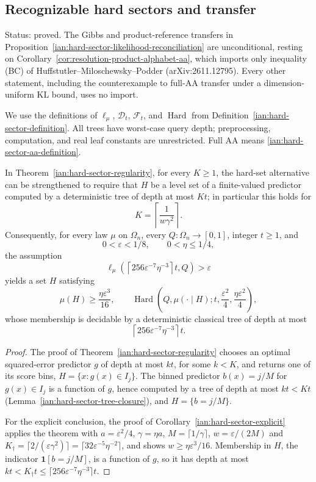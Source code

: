 \subsection{Recognizable hard sectors and transfer}
\label{ian:hard-sector-transfer}

Status: proved. The Gibbs and product-reference transfers in Proposition~\ref{ian:hard-sector-likelihood-reconciliation} are unconditional, resting on Corollary~\ref{cor:resolution-product-alphabet-aa}, which imports only inequality (BC) of Huffstutler--Miloschewsky--Podder (arXiv:2611.12795). Every other statement, including the counterexample to full-AA transfer under a dimension-uniform KL bound, uses no import.

We use the definitions of \(\ell_\mu\), \(\mathcal D_t\),
\(\mathcal F_t\), and \(\operatorname{Hard}\) from
Definition~\ref{ian:hard-sector-definition}. All trees have worst-case
query depth; preprocessing, computation, and real leaf constants are
unrestricted. Full AA means \eqref{ian:hard-sector-aa-definition}.

\begin{corollary}
\label{ian:recognizable-hard-sectors}
In Theorem~\ref{ian:hard-sector-regularity}, for every \(K\ge1\), the
hard-set alternative can be strengthened to require that \(H\) be a
level set of a finite-valued predictor computed by a deterministic tree
of depth at most \(Kt\); in particular this holds for
\[
 K=\left\lceil\frac1{w\gamma^2}\right\rceil.
\]
Consequently, for every law \(\mu\) on \(\Omega_n\), every
\(Q:\Omega_n\to[0,1]\), integer \(t\ge1\), and
\[
 0<\varepsilon<1/8,\qquad 0<\eta\le1/4,
\]
the assumption
\[
 \ell_\mu\left(
 \left\lceil256\varepsilon^{-7}\eta^{-3}\right\rceil t,Q
 \right)>\varepsilon
\]
yields a set \(H\) satisfying
\[
 \mu(H)\ge\frac{\eta\varepsilon^3}{16},\qquad
 \operatorname{Hard}\left(
 Q,\mu(\cdot\mid H);
 t,\frac{\varepsilon^2}{4},
 \frac{\eta\varepsilon^2}{4}\right),
\]
whose membership is decidable by a deterministic classical tree of
depth at most
\[
 \left\lceil256\varepsilon^{-7}\eta^{-3}\right\rceil t.
\]
\end{corollary}

\begin{proof}
The proof of Theorem~\ref{ian:hard-sector-regularity} chooses an
optimal squared-error predictor \(g\) of depth at most \(kt\), for some
\(k<K\), and returns one of its score bins, \(H=\{x:g(x)\in I_j\}\). The
binned predictor \(b(x)=j/M\) for \(g(x)\in I_j\) is a function of \(g\),
hence computed by a tree of depth at most \(kt<Kt\)
(Lemma~\ref{ian:hard-sector-tree-closure}), and \(H=\{b=j/M\}\).

For the explicit conclusion, the proof of
Corollary~\ref{ian:hard-sector-explicit} applies the theorem with
\(a=\varepsilon^2/4\), \(\gamma=\eta a\), \(M=\lceil1/\gamma\rceil\),
\(w=\varepsilon/(2M)\) and
\(K_\dagger=\lceil2/(\varepsilon\gamma^2)\rceil
=\lceil32\varepsilon^{-5}\eta^{-2}\rceil\), and shows
\(w\ge\eta\varepsilon^3/16\). Membership in \(H\),
the indicator \(\mathbf1[b=j/M]\), is a function of \(g\), so it has
depth at most
\(kt<K_\dagger t\le\lceil256\varepsilon^{-7}\eta^{-3}\rceil t\).
\end{proof}

